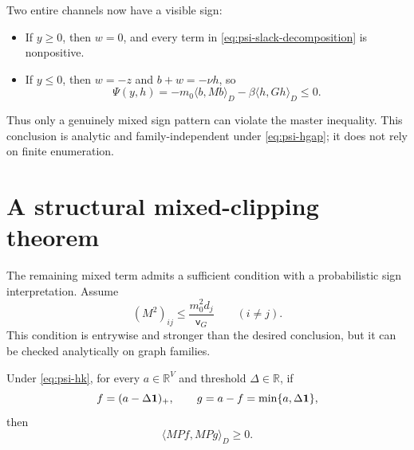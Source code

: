 \documentclass[11pt]{article}
\begin{document}
Two entire channels now have a visible sign:
\begin{itemize}
 \item If $y\geq0$, then $w=0$, and every term in
 \cref{eq:psi-slack-decomposition} is nonpositive.
 \item If $y\leq0$, then $w=-z$ and $b+w=-\nu h$, so
 \begin{equation}
  \Psi(y,h)=-m_0\langle b,Mb\rangle_D
            -\beta\langle h,Gh\rangle_D\leq0.
 \end{equation}
\end{itemize}
Thus only a genuinely mixed sign pattern can violate the master inequality.
This conclusion is analytic and family-independent under
\cref{eq:psi-hgap}; it does not rely on finite enumeration.

\section{A structural mixed-clipping theorem}

The remaining mixed term admits a sufficient condition with a probabilistic
sign interpretation.  Assume
\begin{equation}
 (M^2)_{ij}\leq \frac{m_0^2d_j}{\mathsf v_G}
 \qquad(i\neq j).
 \label{eq:psi-hk}
\end{equation}
This condition is entrywise and stronger than the desired conclusion, but it
can be checked analytically on graph families.

\begin{lemma}
\label{lem:psi-kernel-positive-association}
Under \cref{eq:psi-hk}, for every $a\in\mathbb R^V$ and threshold
$\Delta\in\mathbb R$, if
\begin{equation*}
 f=(a-\Delta\mathbf{1})_+,
 \qquad
 g=a-f=\min\{a,\Delta\mathbf{1}\},
\end{equation*}
then
\begin{equation}
 \langle MPf,MPg\rangle_D\geq0.
 \label{eq:psi-positive-association}
\end{equation}
\end{lemma}
\end{document}
